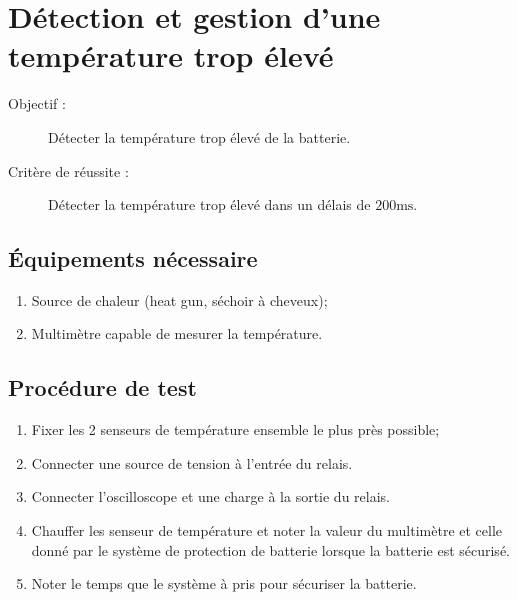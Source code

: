 
\section{Détection et gestion d'une température trop élevé}

\begin{description}
	\item[Objectif :] Détecter la température trop élevé de la batterie.
	\item[Critère de réussite :] Détecter la température trop élevé dans un délais de $200\text{ms}$.
\end{description}

\subsection*{Équipements nécessaire}
\begin{enumerate}
	\item Source de chaleur (heat gun, séchoir à cheveux);
	\item Multimètre capable de mesurer la température.
\end{enumerate}	

\subsection*{Procédure de test}
\begin{enumerate}
	\item Fixer les 2 senseurs de température ensemble le plus près possible; 
	\item Connecter une source de tension à l'entrée du relais.
	\item Connecter l'oscilloscope et une charge à la sortie du relais.
	\item Chauffer les senseur de température et noter la valeur du multimètre et celle donné par le système de protection de batterie lorsque la batterie est sécurisé.
	\item Noter le temps que le système à pris pour sécuriser la batterie.
\end{enumerate}